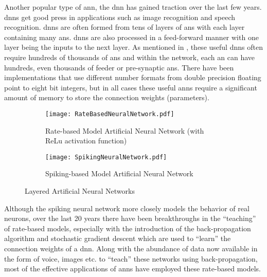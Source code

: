 Another popular type of \ac{ann}, the \ac{dnn} \cite{aizenberg2013multi}\cite{doi:10.1162/neco.2006.18.7.1527} has gained traction over the last few years. \acp{dnn} get good press in applications such as image recognition and speech recognition. 
\acp{dnn} are often formed from tens of layers of \ac{an}s with each layer containing many \ac{an}s. \ac{dnn}s are also processed in a feed-forward manner with one layer being the inputs to the next layer. 
As mentioned in \cite{krizhevsky2012imagenet}, these useful \ac{dnn}s often require hundreds of thousands of \ac{an}s and within the network, each \ac{an} can have hundreds, even thousands of feeder or pre-synaptic \ac{an}s.
There have been implementations that use different number formats from double precision floating point to eight bit integers, but in all cases these useful \ac{ann}s require a significant amount of memory to store the connection weights (parameters).


\begin{figure}[!t]
  \centering
  \captionsetup{justification=centering}
  \captionsetup{width=.9\linewidth}
  \begin{subfigure}{.9\textwidth}
    \centerline{
    \mbox{\texttt{[image: RateBasedNeuralNetwork.pdf]}}
    }
    \caption{Rate-based Model Artificial Neural Network (with ReLu activation function)}
    \label{fig:Rate-based Model Network}
  \end{subfigure}
  
  \begin{subfigure}{.9\textwidth}
    \centerline{
    \mbox{\texttt{[image: SpikingNeuralNetwork.pdf]}}
    }
    \caption{Spiking-based Model Artificial Neural Network}
    \label{fig:Spiking Model Network}
  \end{subfigure}
  \caption{Layered Artificial Neural Networks}
  \label{fig:Layered Artificial Neural Networks}
\end{figure}

Although the spiking neural network more closely models the behavior of real neurons, over the last 20 years there 
have been breakthroughs in the ``teaching'' of rate-based models, especially with the introduction of the back-propagation algorithm \cite{wikipedia_back_propagation} and stochastic gradient descent \cite{wikipedia_sgd} which are used to ``learn'' the connection weights of a \ac{dnn}. 
Along with the abundance of data now available in the form of voice, images etc. to ``teach'' these networks using back-propagation, most of the effective applications of \acp{ann} have employed these rate-based models.

